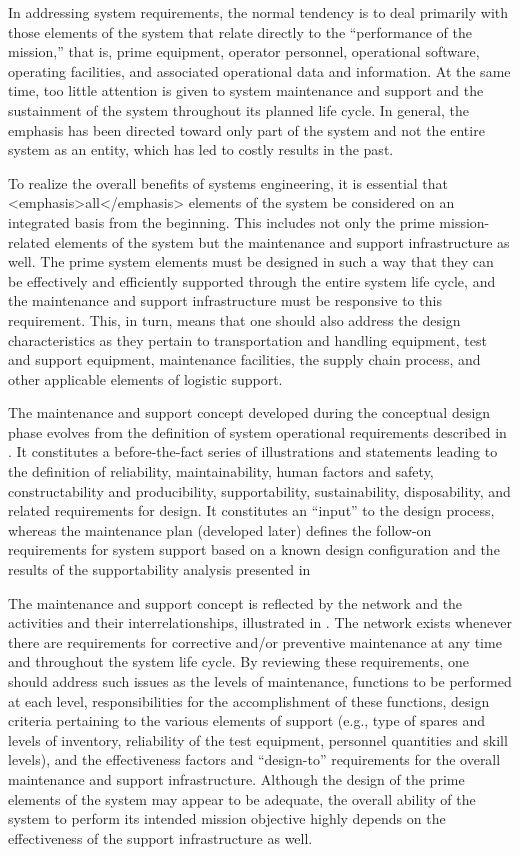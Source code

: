 In addressing system requirements, the normal tendency is to deal primarily with those elements of the system that relate directly to the ``performance of the mission,'' that is, prime equipment, operator personnel, operational software, operating facilities, and associated operational data and information. At the same time, too little attention is given to system maintenance and support and the sustainment of the system throughout its planned life cycle. In general, the emphasis has been directed toward only part of the system and not the entire system as an entity, which has led to costly results in the past.

To realize the overall benefits of systems engineering, it is essential that <emphasis>all</emphasis> elements of the system be considered on an integrated basis from the beginning. This includes not only the prime mission-related elements of the system but the maintenance and support infrastructure as well. The prime system elements must be designed in such a way that they can be effectively and efficiently supported through the entire system life cycle, and the maintenance and support infrastructure must be responsive to this requirement. This, in turn, means that one should also address the design characteristics as they pertain to transportation and handling equipment, test and support equipment, maintenance facilities, the supply chain process, and other applicable elements of logistic support.

The maintenance and support concept developed during the conceptual design phase evolves from the definition of system operational requirements described in . It constitutes a before-the-fact series of illustrations and statements leading to the definition of reliability, maintainability, human factors and safety, constructability and producibility, supportability, sustainability, disposability, and related requirements for design. It constitutes an ``input'' to the design process, whereas the maintenance plan (developed later) defines the follow-on requirements for system support based on a known design configuration and the results of the supportability analysis presented in 

The maintenance and support concept is reflected by the network and the activities and their interrelationships, illustrated in . The network exists whenever there are requirements for corrective and/or preventive maintenance at any time and throughout the system life cycle. By reviewing these requirements, one should address such issues as the levels of maintenance, functions to be performed at each level, responsibilities for the accomplishment of these functions, design criteria pertaining to the various elements of support (e.g., type of spares and levels of inventory, reliability of the test equipment, personnel quantities and skill levels), and the effectiveness factors and ``design-to'' requirements for the overall maintenance and support infrastructure. Although the design of the prime elements of the system may appear to be adequate, the overall ability of the system to perform its intended mission objective highly depends on the effectiveness of the support infrastructure as well.

